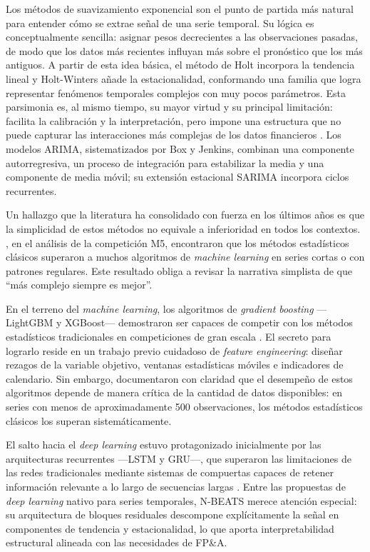 Los métodos de suavizamiento exponencial son el punto de partida más natural para entender cómo se extrae señal de una serie temporal. Su lógica es conceptualmente sencilla: asignar pesos decrecientes a las observaciones pasadas, de modo que los datos más recientes influyan más sobre el pronóstico que los más antiguos. A partir de esta idea básica, el método de Holt incorpora la tendencia lineal y Holt-Winters añade la estacionalidad, conformando una familia que logra representar fenómenos temporales complejos con muy pocos parámetros. Esta parsimonia es, al mismo tiempo, su mayor virtud y su principal limitación: facilita la calibración y la interpretación, pero impone una estructura que no puede capturar las interacciones más complejas de los datos financieros \parencite{Hyndman2021}. Los modelos ARIMA, sistematizados por Box y Jenkins, combinan una componente autorregresiva, un proceso de integración para estabilizar la media y una componente de media móvil; su extensión estacional SARIMA incorpora ciclos recurrentes.

Un hallazgo que la literatura ha consolidado con fuerza en los últimos años es que la simplicidad de estos métodos no equivale a inferioridad en todos los contextos. \textcite{Makridakis2022}, en el análisis de la competición M5, encontraron que los métodos estadísticos clásicos superaron a muchos algoritmos de \textit{machine learning} en series cortas o con patrones regulares. Este resultado obliga a revisar la narrativa simplista de que ``más complejo siempre es mejor''.

En el terreno del \textit{machine learning}, los algoritmos de \textit{gradient boosting} ---LightGBM y XGBoost--- demostraron ser capaces de competir con los métodos estadísticos tradicionales en competiciones de gran escala \parencite{Januschowski2020}. El secreto para lograrlo reside en un trabajo previo cuidadoso de \textit{feature engineering}: diseñar rezagos de la variable objetivo, ventanas estadísticas móviles e indicadores de calendario. Sin embargo, \textcite{Cerqueira2022} documentaron con claridad que el desempeño de estos algoritmos depende de manera crítica de la cantidad de datos disponibles: en series con menos de aproximadamente 500 observaciones, los métodos estadísticos clásicos los superan sistemáticamente.

El salto hacia el \textit{deep learning} estuvo protagonizado inicialmente por las arquitecturas recurrentes ---LSTM y GRU---, que superaron las limitaciones de las redes tradicionales mediante sistemas de compuertas capaces de retener información relevante a lo largo de secuencias largas \parencite{LimZohren2021}. Entre las propuestas de \textit{deep learning} nativo para series temporales, N-BEATS \parencite{Oreshkin2020} merece atención especial: su arquitectura de bloques residuales descompone explícitamente la señal en componentes de tendencia y estacionalidad, lo que aporta interpretabilidad estructural alineada con las necesidades de FP\&A.

